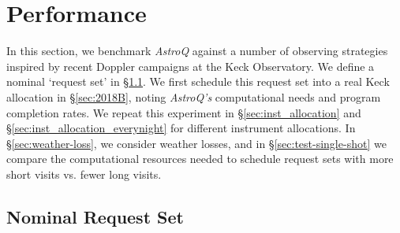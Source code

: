 \documentclass[twocolumn,linenumbers]{aastex63}
\newcommand{\AstroQ}{\textit{AstroQ}\xspace}
\begin{document}
\section{Performance}
\label{sec:performance}

In this section, we benchmark \AstroQ against a number of observing strategies inspired by recent Doppler campaigns at the Keck Observatory. We define a nominal `request set' in \S\ref{sec:nominal}. We first schedule this request set into a real Keck allocation in \S\ref{sec:2018B}, noting {\em AstroQ's} computational needs and program completion rates. We repeat this experiment in \S\ref{sec:inst_allocation} and \S\ref{sec:inst_allocation_everynight} for different instrument allocations. In \S\ref{sec:weather-loss}, we consider weather losses, and in \S\ref{sec:test-single-shot} we compare the computational resources needed to schedule request sets with more short visits vs. fewer long visits. 

\subsection{Nominal Request Set}
\label{sec:nominal}


\end{document}
